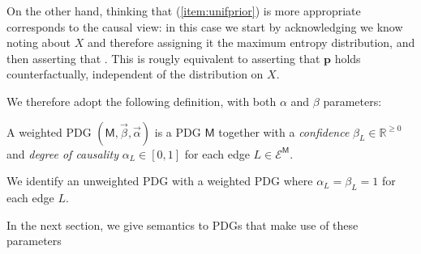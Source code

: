 \documentclass{article}
\theoremstyle{plain}
\theoremstyle{definition}
\newenvironment{example}
	{\pushQED{\qed}\renewcommand{\qedsymbol}{$\triangle$}\examplex}
	{\popQED\endexamplex%
}
\theoremstyle{remark}
\newcommand\mat[1]{\mathbf{#1}}
\newcommand{\Ed}{\mathcal E}
\newcommand{\sfM}{\mathsf M}
\numberwithin{equation}{section}
\begin{document}
{\begin{example}
		
		On the other hand, thinking that (\ref{item:unifprior}) is more appropriate corresponds to the causal view: in this case we start by acknowledging we know noting about $X$ and therefore assigning it the maximum entropy distribution, and then asserting that . This is rougly equivalent to asserting that $\mat p$ holds counterfactually, independent of the distribution on $X$. 
	\end{example}
	
	We therefore adopt the following definition, with both $\alpha$ and $\beta$ parameters:

\begin{defn}
	A weighted PDG $(\sfM, \vec \beta, \vec \alpha)$ is a PDG
        $\sfM$ together with a \emph{confidence} $\beta_L \in \mathbb
        R^{\geq 0}$ and \emph{degree of causality} $\alpha_L \in
        [0,1]$ for each edge $L \in \Ed^\sfM$. 
\end{defn}

We identify an unweighted PDG with a weighted PDG where $\alpha_L
= \beta_L = 1$ for each edge $L$.
        }
%
In the next section, we give semantics to PDGs that make use of
these parameters



\end{document}
